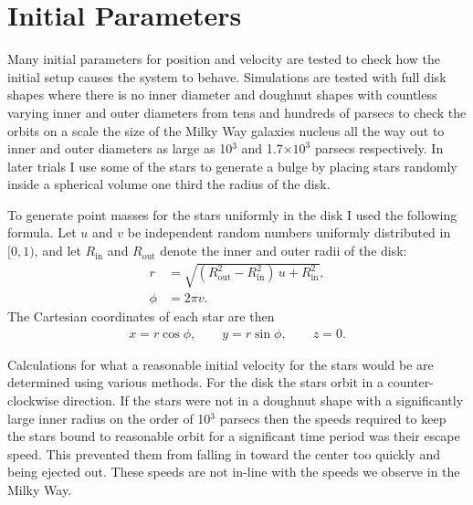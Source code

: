 \documentclass[11pt]{article}
\begin{document}
\section{Initial Parameters}

Many initial parameters for position and velocity are tested to check how the initial setup causes the system to behave. Simulations are tested with full disk shapes where there is no inner diameter and doughnut shapes with countless varying inner and outer diameters from tens and hundreds of parsecs to check the orbits on a scale the size of the Milky Way galaxies nucleus all the way out to inner and outer diameters as large as 10$^3$ and 1.7$\times 10^3$ parsecs respectively. In later trials I use some of the stars to generate a bulge by placing stars randomly inside a spherical volume one third the radius of the disk.

To generate point masses for the stars uniformly in the disk I used the following formula.
Let $u$ and $v$ be independent random numbers uniformly distributed in $[0,1)$, and let
$R_{\mathrm{in}}$ and $R_{\mathrm{out}}$ denote the inner and outer radii of the disk:
\begin{align}
    r   &= \sqrt{(R_{\mathrm{out}}^{2} - R_{\mathrm{in}}^{2})\,u + R_{\mathrm{in}}^{2}},\\
    \phi &= 2\pi v.
\end{align}
The Cartesian coordinates of each star are then
\begin{align}
    x = r\cos\phi,\qquad
    y = r\sin\phi,\qquad
    z = 0.
\end{align}

 Calculations for what a reasonable initial velocity for the stars would be are determined using various methods. For the disk the stars orbit in a counter-clockwise direction. If the stars were not in a doughnut shape with a significantly large inner radius on the order of 10$^3$ parsecs then the speeds required to keep the stars bound to reasonable orbit for a significant time period was their escape speed. This prevented them from falling in toward the center too quickly and being ejected out. These speeds are not in-line with the speeds we observe in the Milky Way.
 \begin{center}
\end{center}
\end{document}

